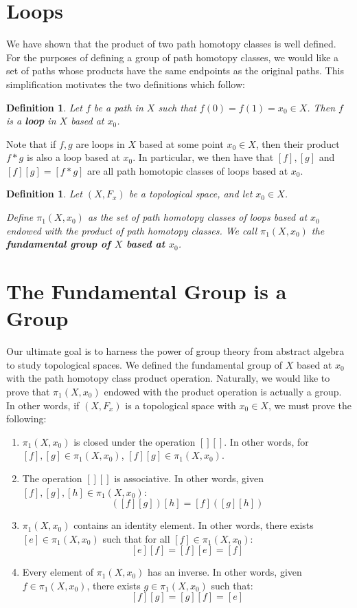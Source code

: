 \documentclass[reqno]{amsart}
\newtheorem{definition}[theorem]{Definition}
\begin{document}
\section{Loops}

We have shown that the product of two path homotopy classes is well defined.
For the purposes of defining a group of path homotopy classes, we would like a set of paths whose products have the same endpoints as the original paths. This simplification motivates the two definitions which follow:

\begin{definition}
Let $f$ be a path in $X$ such that $f(0) = f(1) = x_0\in X$. Then $f$ is a {\bf loop} in $X$ based at $x_0$. 
\end{definition}

Note that if $f,g$ are loops in $X$ based at some point $x_0\in X$, then their product $f*g$ is also a loop based at $x_0$. In particular, we then have that $[f],[g]$ and $[f][g] = [f*g]$ are all path homotopic classes of loops based at $x_0$. 

\begin{definition}
Let $(X,F_x)$ be a topological space, and let $x_0\in X$. 

Define $\pi_1(X,x_0)$ as the set of path homotopy classes of loops based at $x_0$ endowed with the product of path homotopy classes. We call $\pi_1(X,x_0)$ the {\bf fundamental group of $X$ based at $x_0$}.
\end{definition}

\section{The Fundamental Group is a Group}

Our ultimate goal is to harness the power of group theory from abstract algebra to study topological spaces. 
We defined the fundamental group of $X$ based at $x_0$ with the path homotopy class product operation. 
Naturally, we would like to prove that $\pi_1(X,x_0)$ endowed with the product operation is actually a group. In other words, if $(X,F_x)$ is a topological space with $x_0\in X$, we must prove the following:
\begin{enumerate}
\item $\pi_1(X,x_0)$ is closed under the operation $[][]$. In other words, for $[f],[g]\in \pi_1(X,x_0)$, $[f][g] \in \pi_1(X,x_0)$.
\item The operation $[][]$ is associative. In other words, given $[f],[g],[h]\in \pi_1(X,x_0)$:
\[ ([f][g])[h] = [f]([g][h])\]
\item $\pi_1(X,x_0)$ contains an identity element. In other words, there exists $[e]\in \pi_1(X,x_0)$ such that for all $[f]\in\pi_1(X,x_0)$:
\[[e][f] = [f][e] = [f]\]
\item Every element of $\pi_1(X,x_0)$ has an inverse. In other words, given $f\in \pi_1(X,x_0)$, there exists $g\in \pi_1(X,x_0)$ such that:
\[[f][g] = [g][f] = [e]\]
\end{enumerate}
\end{document}

